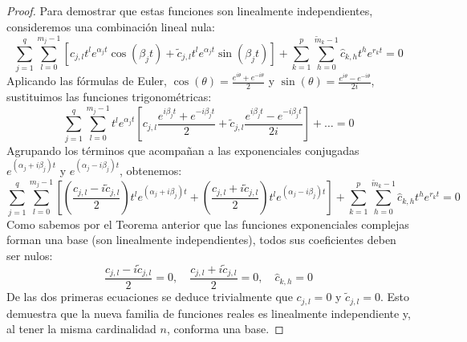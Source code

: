 \begin{proof}
    Para demostrar que estas funciones son linealmente independientes, consideremos una combinación lineal nula:
    \[
        \sum_{j=1}^q \sum_{l=0}^{m_j - 1} \left[ c_{j,l} t^l e^{\alpha_j t} \cos(\beta_j t) + \tilde{c}_{j,l} t^l e^{\alpha_j t} \sin(\beta_j t) \right] + \sum_{k=1}^p \sum_{h=0}^{\tilde{m}_k - 1} \hat{c}_{k,h} t^h e^{r_k t} = 0
    \]
    Aplicando las fórmulas de Euler, $\cos(\theta) = \frac{e^{i\theta} + e^{-i\theta}}{2}$ y $\sin(\theta) = \frac{e^{i\theta} - e^{-i\theta}}{2i}$, sustituimos las funciones trigonométricas:
    \[
        \sum_{j=1}^q \sum_{l=0}^{m_j - 1} t^l e^{\alpha_j t} \left[ c_{j,l} \frac{e^{i \beta_j t} + e^{-i \beta_j t}}{2} + \tilde{c}_{j,l} \frac{e^{i \beta_j t} - e^{-i \beta_j t}}{2i} \right] + \dots = 0
    \]
    Agrupando los términos que acompañan a las exponenciales conjugadas $e^{(\alpha_j + i\beta_j)t}$ y $e^{(\alpha_j - i\beta_j)t}$, obtenemos:
    \[
        \sum_{j=1}^q \sum_{l=0}^{m_j - 1} \left[ \left( \frac{c_{j,l} - i \tilde{c}_{j,l}}{2} \right) t^l e^{(\alpha_j + i \beta_j) t} + \left( \frac{c_{j,l} + i \tilde{c}_{j,l}}{2} \right) t^l e^{(\alpha_j - i \beta_j) t} \right] + \sum_{k=1}^p \sum_{h=0}^{\tilde{m}_k - 1} \hat{c}_{k,h} t^h e^{r_k t} = 0
    \]
    Como sabemos por el Teorema anterior que las funciones exponenciales complejas forman una base (son linealmente independientes), todos sus coeficientes deben ser nulos:
    \[
        \frac{c_{j,l} - i \tilde{c}_{j,l}}{2} = 0, \quad \frac{c_{j,l} + i \tilde{c}_{j,l}}{2} = 0, \quad \hat{c}_{k,h} = 0
    \]
    De las dos primeras ecuaciones se deduce trivialmente que $c_{j,l} = 0$ y $\tilde{c}_{j,l} = 0$. Esto demuestra que la nueva familia de funciones reales es linealmente independiente y, al tener la misma cardinalidad $n$, conforma una base.
\end{proof}


